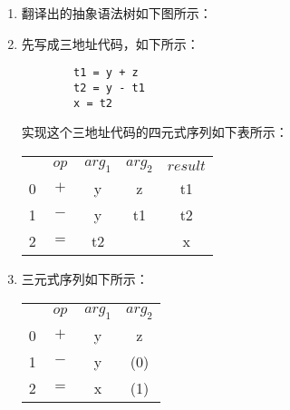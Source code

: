 \documentclass[UTF8]{report}
\begin{document}
\begin{enumerate}
    \item 翻译出的抽象语法树如下图所示：
    
    \begin{center}
    \end{center}

    \item 先写成三地址代码，如下所示：
    
    \begin{lstlisting}
        t1 = y + z
        t2 = y - t1
        x = t2
    \end{lstlisting}

    实现这个三地址代码的四元式序列如下表所示：
    \begin{center}
        \begin{tabular}{c|c|c|c|c|}
            \multicolumn{1}{c}{} & \multicolumn{1}{c}{$op$} & \multicolumn{1}{c}{$arg_1$} & \multicolumn{1}{c}{$arg_2$} & \multicolumn{1}{c}{$result$} \\
            \cline{2-5}
            0 & $+$ & y & z & t1 \\
            \cline{2-5}
            1 & $-$ & y & t1 & t2 \\
            \cline{2-5}
            2 & $=$ & t2 & & x \\
            \cline{2-5}
        \end{tabular}
    \end{center}

    \item 三元式序列如下所示：
    
    \begin{center}
        \begin{tabular}{c|c|c|c|}
            \multicolumn{1}{c}{} & \multicolumn{1}{c}{$op$} & \multicolumn{1}{c}{$arg_1$} & \multicolumn{1}{c}{$arg_2$} \\
            \cline{2-4}
            0 & $+$ & y & z \\
            \cline{2-4}
            1 & $-$ & y & (0) \\
            \cline{2-4}
            2 & $=$ & x & (1) \\
            \cline{2-4}
        \end{tabular}
    \end{center}


\end{enumerate}
\end{document}
